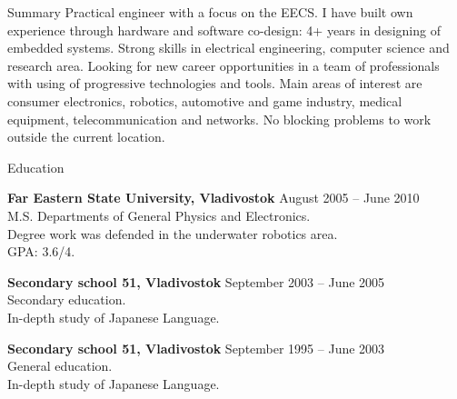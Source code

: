 \documentclass{template}
\begin{document}

\begin{rSection}{Summary}
Practical engineer with a focus on the EECS. I have built own experience through hardware and software co-design: 4+ years in designing of embedded systems. Strong skills in electrical engineering, computer science and research area. Looking for new career opportunities in a team of professionals with using of progressive technologies and tools. Main areas of interest are consumer electronics, robotics, automotive and game industry, medical equipment, telecommunication and networks. No blocking problems to work outside the current location.
\end{rSection}


\begin{rSection}{Education}

{\bf Far Eastern State University, Vladivostok} \hfill {August 2005 -- June 2010} \\
M.S. Departments of General Physics and Electronics. \\
Degree work was defended in the underwater robotics area. \\
GPA: 3.6/4.

{\bf Secondary school 51, Vladivostok} \hfill {September 2003 -- June 2005} \\
Secondary education. \\
In-depth study of Japanese Language.

{\bf Secondary school 51, Vladivostok} \hfill {September 1995 -- June 2003} \\
General education. \\
In-depth study of Japanese Language.

\end{rSection}

\end{document}
